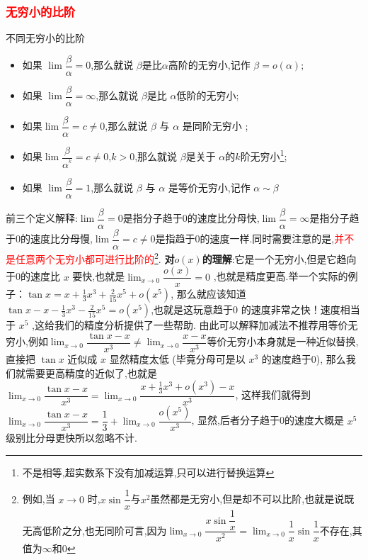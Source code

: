 \documentclass[8pt a4paper, oneside, UTF8]{ctexbook}
\begin{document}
\begin{sloppypar}
    \subsubsection{\textcolor{red}{无穷小的比阶}}
    \begin{defn}{不同无穷小的比阶}{}
        \begin{itemize}
            \item 如果 $\lim \dfrac{\beta}{\alpha} =0$,那么就说 $\beta$是比$\alpha$高阶的无穷小,记作 $\beta=o(\alpha);$
            \item  如果 $\lim \dfrac\beta\alpha  =\infty$,那么就说 $\beta$是比 $\alpha$低阶的无穷小;
            \item 如果$\lim\dfrac{\beta}{\alpha} =c\neq 0$,那么就说 $\beta$ 与 $\alpha$ 是同阶无穷小 ;
            \item 如果$\lim\dfrac{\beta}{\alpha^{^k}} =c \neq 0$,$k > 0$,那么就说 $\beta$是关于 $\alpha$的$k$阶无穷小\footnote{不是相等,超实数系下没有加减运算,只可以进行替换运算};
            \item 如果 $\lim \dfrac\beta\alpha = 1$,那么就说 $\beta$ 与 $\alpha$ 是等价无穷小,记作 $\alpha\sim\beta$
        \end{itemize}
    \end{defn}
    前三个定义解释:$\lim \dfrac{\beta}{\alpha} =0$是指分子趋于$0$的速度比分母快,$\lim \dfrac\beta\alpha =\infty$是指分子趋于$0$的速度比分母慢,$\lim\dfrac{\beta}{\alpha} =c\neq 0$是指趋于$0$的速度一样.同时需要注意的是,\textcolor{red}{并不是任意两个无穷小都可进行比阶的}\footnote{例如,当 $x\to 0$ 时,$x\sin\dfrac1x$与$x^2$虽然都是无穷小,但是却不可以比阶,也就是说既无高低阶之分,也无同阶可言,因为$\lim_{x \to 0}\dfrac{x \sin \dfrac{1}{x}}{x^2}=\lim_{x\to0}\dfrac1x\sin\dfrac1x$不存在,其值为$\infty$和$0$}.
    \newline
    \textbf{对$o(x)$的理解}:它是一个无穷小,但是它趋向于0的速度比 $x$ 要快,也就是$\lim_{x\to0}\dfrac{o(x)}{x}=0$ ,也就是精度更高.举一个实际的例子：$\tan x=x+\frac13x^3+\frac2{15}x^5+o\left(x^5\right)$, 那么就应该知道$\tan x-x-\frac{1}{3}x^{3}-\frac{2}{15}x^{5}=o\left(x^{5}\right)$,也就是这玩意趋于0 的速度非常之快！速度相当于 $x^5$ ,这给我们的精度分析提供了一些帮助. 由此可以解释加减法不推荐用等价无穷小,例如$\lim_{x\to0}\dfrac{\tan x-x}{x^3}\neq\lim_{x\to0}\dfrac{x-x}{x^3}$等价无穷小本身就是一种近似替换,直接把 $\tan x$ 近似成 $x$ 显然精度太低 (毕竟分母可是以 $x^3$ 的速度趋于0), 那么我们就需要更高精度的近似了,也就是 $\lim_{x\to0}\dfrac{\tan x-x}{x^3}=\lim_{x\to0}\dfrac{x+\frac13x^3+o\left(x^3\right)-x}{x^3}$, 这样我们就得到 $\lim_{x\to0}\dfrac{\tan x-x}{x^3}=\dfrac13+\lim_{x\to0}\dfrac{o(x^5)}{x^3}$, 显然,后者分子趋于0的速度大概是 $x^5$ 级别比分母更快所以忽略不计.

\end{sloppypar}
\end{document}
